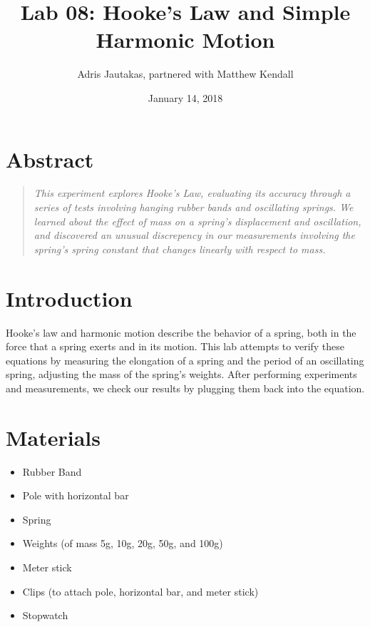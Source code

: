 \documentclass[12pt]{article}
\title{Lab 08: Hooke's Law and Simple Harmonic Motion}
\author{Adris Jautakas, partnered with Matthew Kendall}
\date{January 14, 2018}
\begin{document}
    \maketitle

    \pagebreak

    \section*{Abstract}
        \begin{quote}
        {\textit {\small 
            This experiment explores Hooke's Law, evaluating its accuracy through
            a series of tests involving hanging rubber bands and oscillating springs.
            We learned about the effect of mass on a spring's displacement and 
            oscillation, and discovered an unusual discrepency in our measurements
            involving the spring's spring constant that changes linearly with
            respect to mass.
        } }
        \end{quote}

    \section{Introduction}
        Hooke's law and harmonic motion describe the behavior of a spring, both
        in the force that a spring exerts and in its motion. This lab attempts
        to verify these equations by measuring the elongation of a spring and
        the period of an oscillating spring, adjusting the mass of the spring's
        weights. After performing experiments and measurements, we check
        our results by plugging them back into the equation.

    \section{Materials}
        \begin{itemize}
            \item Rubber Band
            \item Pole with horizontal bar
            \item Spring
            \item Weights (of mass 5g, 10g, 20g, 50g, and 100g)
            \item Meter stick
            \item Clips (to attach pole, horizontal bar, and meter stick)
            \item Stopwatch
        \end{itemize}
    
\end{document}
